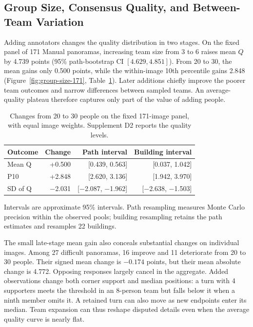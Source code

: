 \subsection{Group Size, Consensus Quality, and Between-Team Variation}
\label{sec:group-size}

Adding annotators changes the quality distribution in two stages. On the fixed panel of 171 Manual panoramas, increasing team size from 3 to 6 raises mean $Q$ by 4.739 points (95\% path-bootstrap CI $[4.629,4.851]$). From 20 to 30, the mean gains only 0.500 points, while the within-image 10th percentile gains 2.848 (Figure~\ref{fig:group-size-171}, Table~\ref{tab:group-size-intervals}). Later additions chiefly improve the poorer team outcomes and narrow differences between sampled teams. An average-quality plateau therefore captures only part of the value of adding people.



\begin{table}[t]
\centering\small
\caption{Changes from 20 to 30 people on the fixed 171-image panel, with equal image weights. Supplement D2 reports the quality levels.}
\label{tab:group-size-milestones}
\label{tab:group-size-intervals}
\setlength{\tabcolsep}{3pt}
\begin{tabular}{@{}lrrr@{}}
\toprule
Outcome & Change & Path interval & Building interval\\
\midrule
Mean Q & +0.500 & [0.439, 0.563] & [0.037, 1.042]\\
P10 & +2.848 & [2.620, 3.136] & [1.942, 3.970]\\
SD of Q & $-$2.031 & [$-$2.087, $-$1.962] & [$-$2.638, $-$1.503]\\
\bottomrule
\end{tabular}
\par\smallskip
\parbox{\columnwidth}{\footnotesize Intervals are approximate 95\% intervals. Path resampling measures Monte Carlo precision within the observed pools; building resampling retains the path estimates and resamples 22 buildings.}
\end{table}

The small late-stage mean gain also conceals substantial changes on individual images. Among 27 difficult panoramas, 16 improve and 11 deteriorate from 20 to 30 people. Their signed mean change is $-0.174$ points, but their mean absolute change is 4.772. Opposing responses largely cancel in the aggregate. Added observations change both corner support and median positions: a turn with 4 supporters meets the threshold in an 8-person team but falls below it when a ninth member omits it. A retained turn can also move as new endpoints enter its median. Team expansion can thus reshape disputed details even when the average quality curve is nearly flat.

